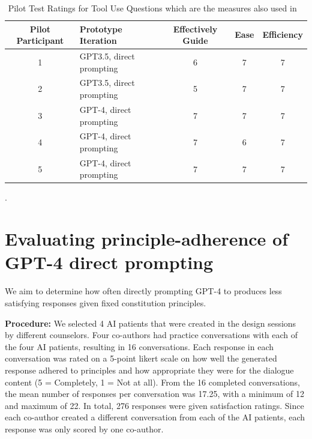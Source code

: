 \documentclass[11pt]{article}
\begin{document}
\begin{table}[ht]
    \small
    \centering
    \begin{tabular}{|c|l|c|c|c|}
         \hline
         Pilot Participant &Prototype Iteration&  Effectively Guide&  Ease&  Efficiency\\ \hline
         1&GPT3.5, direct prompting &  6&  7&  7\\
         2&GPT3.5, direct prompting&  5&  7&  7\\
         3&GPT-4, direct prompting&  7&  7&  7\\
         4&GPT-4, direct prompting&  7&  6&  7\\
         5&GPT-4, direct prompting& 7& 7& 7\\ \hline
    \end{tabular}
    \caption{Pilot Test Ratings for Tool Use Questions which are the measures also used in ~\citet{petridis2023constitutionmaker}}.
    \label{tab:tooluse-formative}
\end{table}


\section{Evaluating principle-adherence of GPT-4 direct prompting} \label{appendix-sec:principle-adherence-testing}

We aim to determine how often directly prompting GPT-4 to produces less satisfying responses given fixed constitution principles.


\textbf{Procedure:} We selected 4 AI patients that were created in the design sessions by different counselors. Four co-authors had practice conversations with each of the four AI patients, resulting in 16 conversations. Each response in each conversation was rated on a 5-point likert scale on how well the generated response adhered to principles and how appropriate they were for the dialogue content (5 = Completely, 1 = Not at all). From the 16 completed conversations, the mean number of responses per conversation was 17.25, with a minimum of 12 and maximum of 22. In total, 276 responses were given satisfaction ratings. Since each co-author created a different conversation from each of the AI patients, each response was only scored by one co-author.
\end{document}
